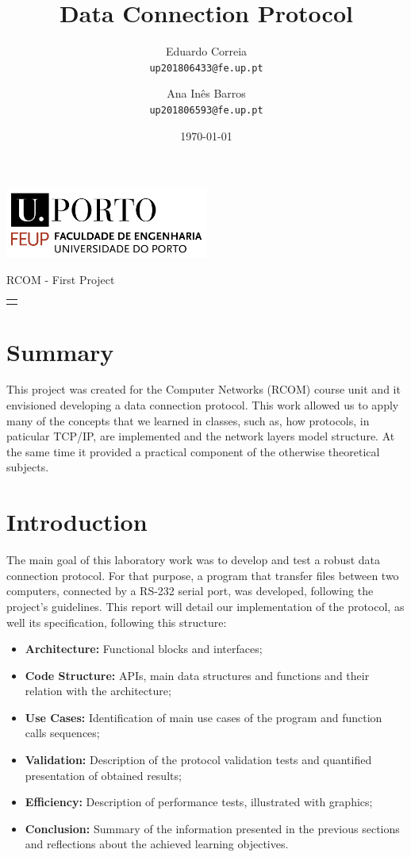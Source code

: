 \documentclass[11pt]{report}
\title{Data Connection Protocol}
\author{
    \Large
        Eduardo Correia \\
    \texttt{up201806433@fe.up.pt}
    \and
    \Large
    Ana Inês Barros \\
    \texttt{up201806593@fe.up.pt}
}
\date{\today}
\makeatletter
\renewcommand{\maketitle}{
    \begin{titlepage}
        \includegraphics[width=0.5\textwidth]{images/feup.png}
        \begin{center} 
            \par\vspace{8cm}
            {\Huge\@title}
            \par\vspace{1cm}
            {\huge RCOM - First Project}
            \par\vspace{1cm}
            \begin{tabular}[t]{c}
             \@author
            \end{tabular}
            \vfill
            \@date
        \end{center}
    \end{titlepage}
}
\makeatother
\begin{document}
\maketitle

\titlespacing*{\chapter}{0pt}{0pt}{1pt}

\tableofcontents

\chapter{Summary}

This project was created for the Computer Networks (RCOM) course unit and it
envisioned developing a data connection protocol. This work allowed us to apply many of the concepts that we learned in classes, such as, how protocols, in paticular TCP/IP, are implemented and the network layers model structure. At the same time it provided a practical component of the otherwise theoretical subjects. 

\chapter{Introduction}


The main goal of this laboratory work was to develop and test a robust data connection protocol. For that purpose, a program that transfer files between two computers, connected by a RS-232 serial port, was developed, following the project's guidelines. This report will detail our implementation of the protocol, as well its specification, following this structure:

\begin{itemize}
  \item \textbf{Architecture:} 
  Functional blocks and interfaces;
  
  \item \textbf{Code Structure:} 
  APIs, main data structures and functions and their relation with the architecture;
  
  \item \textbf{Use Cases:} Identification of main use cases of the program and function calls sequences;
  
  \item \textbf{Validation:} Description of the protocol validation tests and quantified presentation of obtained results;
  
  \item \textbf{Efficiency:} Description of performance tests, illustrated with graphics;

  \item \textbf{Conclusion:} Summary of the information presented in the previous sections and reflections about the achieved learning objectives.
  
\end{itemize}
\end{document}
